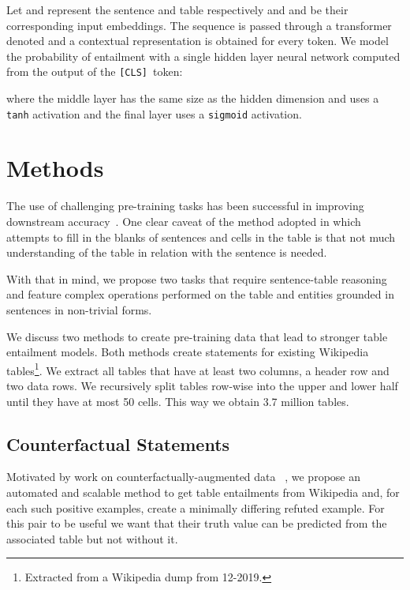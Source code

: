 \documentclass[11pt,a4paper]{article}
\newcommand{\cls}{\texttt{[CLS]}}
\theoremstyle{definition}
\begin{document}
Let  and  represent the sentence and table respectively and  and  be their corresponding input embeddings. 
The sequence  is passed through a transformer~\cite{vaswani-2017} denoted  and a contextual representation is obtained for every token. We model the probability of entailment  with a single hidden layer neural network computed from the output of the \cls ~token:

where the middle layer has the same size as the hidden dimension and uses a \texttt{tanh} activation and the final layer uses a \texttt{sigmoid} activation.





 \section{Methods}
\label{sec:methods}

The use of challenging pre-training tasks has been successful in improving downstream accuracy~\cite{Clark2020ELECTRA:}.
One clear caveat of the method adopted in \citet{herzig-2020} which attempts to fill in the blanks of sentences and cells in the table is that not much understanding of the table in relation with the sentence is needed. 

With that in mind, we propose two tasks that require sentence-table reasoning and feature complex operations performed on the table and entities grounded in sentences in non-trivial forms.

We discuss two methods to create pre-training data that lead to stronger table entailment models.
Both methods create statements for existing Wikipedia tables\footnote{Extracted from a Wikipedia dump from 12-2019.}. 
We extract all tables that have at least two columns, a header row and two data rows.
We recursively split tables row-wise into the upper and lower half until they have at most 50 cells.
This way we obtain 3.7 million tables.

\subsection{Counterfactual Statements}

Motivated by work on counterfactually-augmented data ~\cite{Kaushik2020Learning, gardner-2020},
we propose an automated and scalable method to get table entailments from Wikipedia and, for each such positive examples, create a minimally differing refuted example.
For this pair to be useful we want that their truth value can be predicted from the associated table but not without it.
\end{document}
